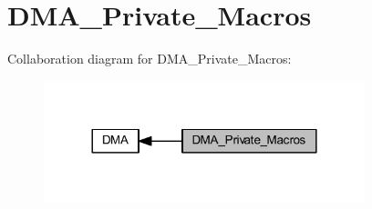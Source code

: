 \hypertarget{group___d_m_a___private___macros}{}\section{D\+M\+A\+\_\+\+Private\+\_\+\+Macros}
\label{group___d_m_a___private___macros}
Collaboration diagram for D\+M\+A\+\_\+\+Private\+\_\+\+Macros\+:
\nopagebreak
\begin{figure}[H]
\begin{center}
\leavevmode
\includegraphics[width=264pt]{group___d_m_a___private___macros}
\end{center}
\end{figure}
